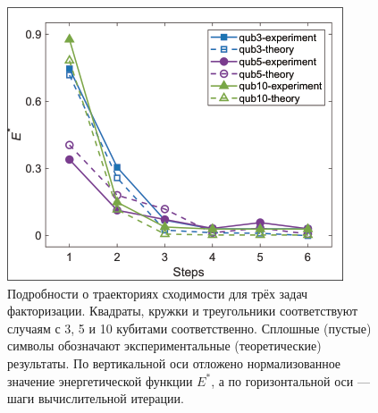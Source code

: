 \begin{figure}
    \centering
    \includegraphics[scale=0.9]{inc/fig_06.png}
    \caption{
    Подробности о траекториях сходимости для трёх задач факторизации. Квадраты,
    кружки и треугольники соответствуют случаям с 3, 5 и 10 кубитами
    соответственно. Сплошные (пустые) символы обозначают экспериментальные
    (теоретические) результаты. По вертикальной оси отложено нормализованное
    значение энергетической функции $E^{*}$, а по горизонтальной оси — шаги
    вычислительной итерации.
    }
    \label{fig:fig06}
\end{figure}

